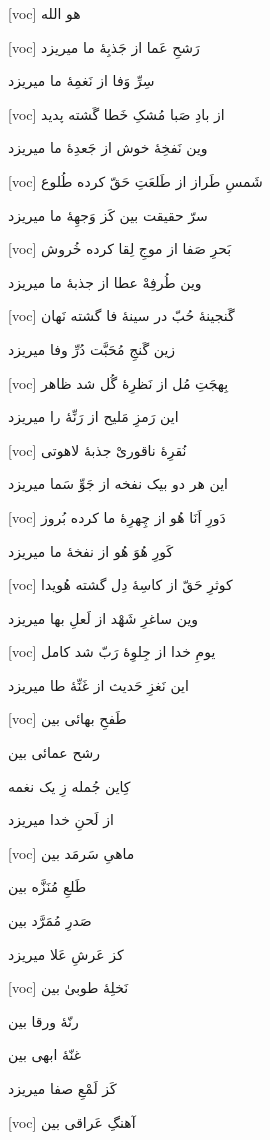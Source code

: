 \documentclass[11pt]{article}
\newenvironment{orig}
  {\begin{farsi}[voc]}
  {\end{farsi}}
\newenvironment{word}{}{}
\newcommand{\ayat}[1]{\vspace{4ex}\begin{orig}#1\end{orig}}
\begin{document}
\fontsize{24}{32}

\thispagestyle{empty}

\begin{word}
\ayat{
هو الله
}

\ayat{
رَشحِ عَما از جَذبِۀ ما میریزد

سِرِّ وَفا از نَغمِۀ ما میریزد
}

\ayat{
از بادِ صَبا مُشکِ خَطا گَشته پدید

وین نَفخِۀ خوش از جَعدِۀ ما میریزد
}

\ayat{
شَمسِ طَراز از طَلعَتِ حَقّ کرده طُلوع

سرّ حقیقت بین کَز وَجهِۀ ما میریزد
}

\ayat{
بَحرِ صَفا از موجِ لِقا کرده خُروش

وین طُرفِهْ عطا از جذبۀ ما میریزد
}

\ayat{
گَنجینۀ حُبّ در سینۀ فا گشته نَهان

زین گَنجِ مُحَبَّت دُرِّ وفا ميريزد
}

\ayat{
بِهجَتِ مُل از نَظرِۀ گُل شد ظاهر

این رَمزِ مَلیح از رَنِّۀ را میریزد
}

\ayat{
نُقرِۀ ناقوریْ جذبۀ لاهوتی

این هر دو بیک نفخه از جَوِّ سَما میریزد
}

\ayat{
دَورِ اَنَا هُو از چِهرِۀ ما کرده بُروز

کَورِ هُوَ هُو از نفخۀ ما میریزد
}

\ayat{
کوثرِ حَقّ از کاسِۀ دِل گشته هُویدا

وین ساغرِ شَهْد از لَعلِ بها میریزد
}

\ayat{
یومِ خدا از جِلوِۀ رَبّ شد کامل

این نَغزِ حَدیث از غَنِّۀ طا میریزد
}

\ayat{
طَفحِ بهائی بین

رشح عمائی بین

کِاین جُمله زِ یک نغمه

از لَحنِ خدا میریزد
}

\ayat{
ماهیِ سَرمَد بین

طَلعِ مُنَزَّه بین

صَدرِ مُمَرَّد بین

کز عَرشِ عَلا میریزد
}

\ayat{
نَخلِۀ طوبیٰ بین

رنّۀ ورقا بین

غنّۀ ابهی بین

کَز لَمْعِ صفا میریزد
}

\ayat{
آهنگِ عَراقی بین

}
\end{word}
\end{document}
